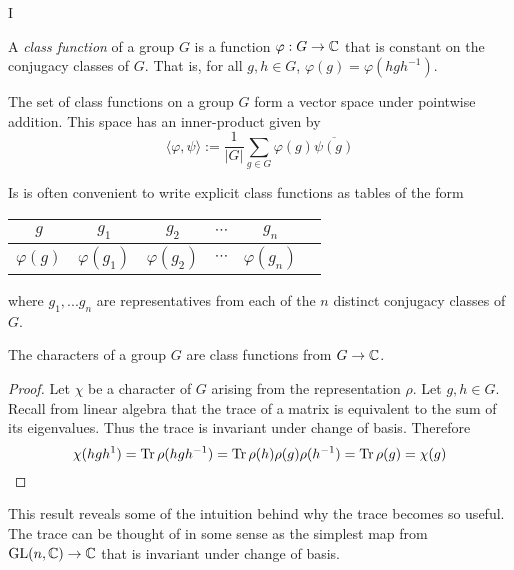 I

\begin{definition}
    A \emph{class function} of a group $G$ is a function $\varphi : G \rightarrow \mathbb{C}$ that is constant on the 
    conjugacy classes of $G$. That is, for all $g,h \in G$, $\varphi(g) = \varphi(hgh^{-1})$.
    
    The set of class functions on a group $G$ form a vector space under pointwise addition. This space has an 
    inner-product given by
    \[
        \langle \varphi, \psi \rangle := \frac{1}{|G|} \sum_{g \in G} \varphi(g)\overline{\psi(g)}
    \]
\end{definition}


Is is often convenient to write explicit class functions as tables of the form 

\begin{center}
\begin{tabular}{c|ccccc}
    $g$ & $g_1$ & $g_2$ & $\cdots$ & $g_n$  \\ \hline
    $\varphi(g)$ & $\varphi(g_1)$ & $\varphi(g_2)$ & $\cdots$ & $\varphi(g_n)$
\end{tabular}
\end{center}
where $g_1, ... g_n$ are representatives from each of the $n$ distinct conjugacy classes of $G$.




\begin{theorem}
    The characters of a group $G$ are class functions from $G \rightarrow \mathbb{C}$.
\end{theorem}

\begin{proof}
    Let $\chi$ be a character of $G$ arising from the representation $\rho$. Let $g, h \in G$. Recall from linear 
    algebra that the trace of a matrix is equivalent to the sum of its eigenvalues.  Thus the trace is invariant 
    under change of basis. Therefore
    \[
        \chi(hgh^{1}) = \text{Tr}\, \rho(hgh^{-1}) = \text{Tr}\, \rho(h) \rho(g)\rho(h^{-1}) = \text{Tr}\, \rho(g) = \chi(g)
    \]
\end{proof}

This result reveals some of the intuition behind why the trace becomes so useful. The trace can be thought of in 
some sense as the simplest map from $\operatorname{GL}(n, \mathbb{C}) \rightarrow \mathbb{C}$ that is invariant under change of basis. 



